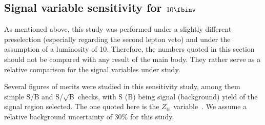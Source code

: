 \subsection{Signal variable sensitivity for \texorpdfstring{$10\fbinv$}{10 fbinv}}
\label{sec:sigvarstudy:sensitivity}

As mentioned above, this study was performed under a slightly different preselection (especially regarding the second lepton veto) and under the assumption of a luminosity of 10\fbinv.
Therefore, the numbers quoted in this section should not be compared with any result of the main body. They rather serve as a relative comparison for the signal variables under study.

Several figures of merits were studied in this sensitivity study, among them simple S/B and S/$\sqrt{\mathrm{B}}$ checks, with S (B) being signal (background) yield of the signal region selected.
The one quoted here is the $Z_\mathrm{bi}$ variable~\cite{Cousins:2008zz}. We assume a relative background uncertainty of 30\% for this study.

